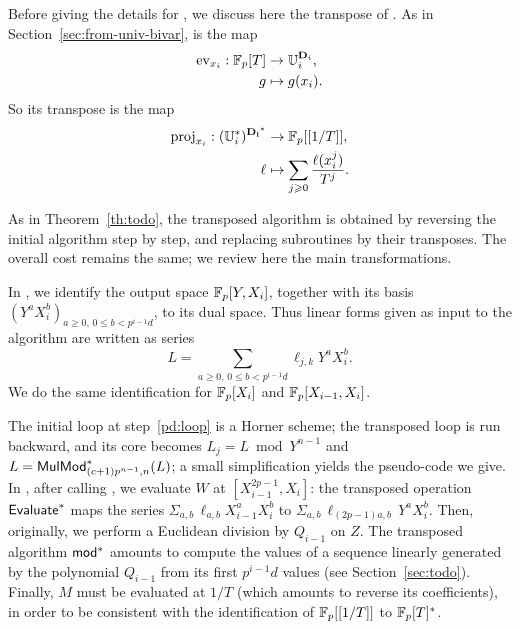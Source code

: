 Before giving the details for , we discuss here the
transpose of .  As in
Section~\ref{sec:from-univ-bivar},  is the map
\begin{equation}
  \label{eq:81}
  \begin{aligned}
    \operatorname{ev}_{x_i}:\mathbb{F}_p[T] &\rightarrow \mathbb{U}_i^{\mathbf{D}_i}\text{,}\\ 
    g&\mapsto g(x_i)\text{.}
  \end{aligned}
\end{equation}
So its transpose is the map
\begin{equation}
  \label{eq:82}
  \begin{aligned}
    \operatorname{proj}_{x_i}:(\mathbb{U}_i^\ast)^{\mathbf{D_i}^\ast}&\rightarrow\mathbb{F}_p[[1/T]]\text{,}\\
    \ell&\mapsto\sum_{j\geqslant0}\frac{\ell(x_i^j)}{T^j}\text{.}
  \end{aligned}
\end{equation}

As in Theorem~\ref{th:todo}, the transposed algorithm is obtained by
reversing the initial algorithm step by step, and replacing
subroutines by their transposes. The overall cost remains the same; we
review here the main transformations.

In , we identify the output space $\mathbb{F}_p[Y,X_i]$,
together with its basis $(Y^aX_i^b)_{a\ge0,\,0\le b<p^{i-1}d}$, to its
dual space. Thus linear forms given as input to the algorithm are
written as series
\begin{equation}
  \label{eq:84}
  L=\sum_{a\ge0,\,0\le b<p^{i-1}d}\ell_{j,k}Y^aX_i^b
  \text{.}
\end{equation}
We do the same identification for $\mathbb{F}_p[X_i]$ and $\mathbb{F}_p[X_{i-1},X_i]$.

The initial loop at step~\ref{pd:loop} is a Horner scheme; the
transposed loop is run backward, and its core becomes $L_j=L\bmod
Y^{n-1}$ and $L={\sf MulMod}_{(c+1)p^{n-1},n}^\ast(L)$; a small
simplification yields the pseudo-code we give.  In ,
after calling , we evaluate $W$ at
$[X_{i-1}^{2p-1},X_i]$: the transposed operation ${\sf
    Evaluate}^\ast$ maps the series $\Sigma_{a,b}\, \ell_{a,b} X_{i-1}^a
X_i^b$ to $\Sigma_{a,b}\, \ell_{(2p-1)a,b}\, Y^a X_i^b$. Then,
originally, we perform a Euclidean division by $Q_{i-1}$ on $Z$. The
transposed algorithm $\sf mod^\ast$ amounts to compute the values of
a sequence linearly generated by the polynomial $Q_{i-1}$ from its
first $p^{i-1}d$ values (see Section~\ref{sec:todo}). Finally, $M$
must be evaluated at $1/T$ (which amounts to reverse its
coefficients), in order to be consistent with the identification of
$\mathbb{F}_p[[1/T]]$ to $\mathbb{F}_p[T]^\ast$.

